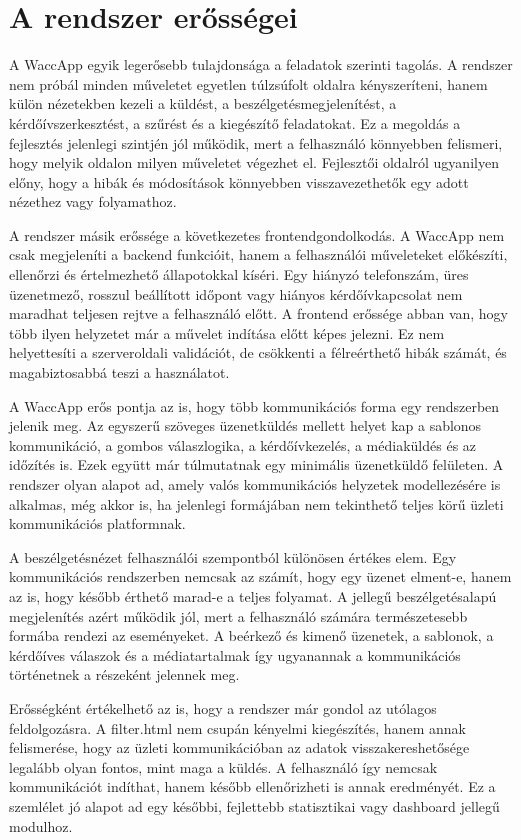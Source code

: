 \section{A rendszer erősségei}

A WaccApp egyik legerősebb tulajdonsága a feladatok szerinti tagolás. A rendszer nem próbál minden műveletet egyetlen túlzsúfolt oldalra kényszeríteni, hanem külön nézetekben kezeli a küldést, a beszélgetésmegjelenítést, a kérdőívszerkesztést, a szűrést és a kiegészítő feladatokat. Ez a megoldás a fejlesztés jelenlegi szintjén jól működik, mert a felhasználó könnyebben felismeri, hogy melyik oldalon milyen műveletet végezhet el. Fejlesztői oldalról ugyanilyen előny, hogy a hibák és módosítások könnyebben visszavezethetők egy adott nézethez vagy folyamathoz.

A rendszer másik erőssége a következetes frontendgondolkodás. A WaccApp nem csak megjeleníti a backend funkcióit, hanem a felhasználói műveleteket előkészíti, ellenőrzi és értelmezhető állapotokkal kíséri. Egy hiányzó telefonszám, üres üzenetmező, rosszul beállított időpont vagy hiányos kérdőívkapcsolat nem maradhat teljesen rejtve a felhasználó előtt. A frontend erőssége abban van, hogy több ilyen helyzetet már a művelet indítása előtt képes jelezni. Ez nem helyettesíti a szerveroldali validációt, de csökkenti a félreérthető hibák számát, és magabiztosabbá teszi a használatot.

A WaccApp erős pontja az is, hogy több kommunikációs forma egy rendszerben jelenik meg. Az egyszerű szöveges üzenetküldés mellett helyet kap a sablonos kommunikáció, a gombos válaszlogika, a kérdőívkezelés, a médiaküldés és az időzítés is. Ezek együtt már túlmutatnak egy minimális üzenetküldő felületen. A rendszer olyan alapot ad, amely valós kommunikációs helyzetek modellezésére is alkalmas, még akkor is, ha jelenlegi formájában nem tekinthető teljes körű üzleti kommunikációs platformnak.

A beszélgetésnézet felhasználói szempontból különösen értékes elem. Egy kommunikációs rendszerben nemcsak az számít, hogy egy üzenet elment-e, hanem az is, hogy később érthető marad-e a teljes folyamat. A  jellegű beszélgetésalapú megjelenítés azért működik jól, mert a felhasználó számára természetesebb formába rendezi az eseményeket. A beérkező és kimenő üzenetek, a sablonok, a kérdőíves válaszok és a médiatartalmak így ugyanannak a kommunikációs történetnek a részeként jelennek meg.

Erősségként értékelhető az is, hogy a rendszer már gondol az utólagos feldolgozásra. A filter.html nem csupán kényelmi kiegészítés, hanem annak felismerése, hogy az üzleti kommunikációban az adatok visszakereshetősége legalább olyan fontos, mint maga a küldés. A felhasználó így nemcsak kommunikációt indíthat, hanem később ellenőrizheti is annak eredményét. Ez a szemlélet jó alapot ad egy későbbi, fejlettebb statisztikai vagy dashboard jellegű modulhoz.

